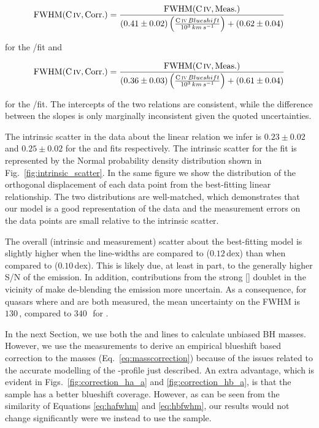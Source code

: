 \begin{equation}
    \label{eq:hafwhm}
    \mathrm{FWHM}(\mathrm{C}\,\textsc{iv}, \mathrm{Corr.}) = \frac{\mathrm{FWHM}(\mathrm{C}\,\textsc{iv}, \mathrm{Meas.})}{ (0.41\pm0.02) \left(\frac{\mathrm{C}\,\textsc{iv}\, Blueshift}{10^3 {\mathrm \,km\,s^{-1}}} \right) + (0.62\pm0.04)}
\end{equation}

\noindent for the /\ha fit and 

\begin{equation}
    \label{eq:hbfwhm}
    \mathrm{FWHM}(\mathrm{C}\,\textsc{iv}, \mathrm{Corr.}) = \frac{\mathrm{FWHM}(\mathrm{C}\,\textsc{iv}, \mathrm{Meas.})}{ (0.36\pm0.03) \left(\frac{\mathrm{C}\,\textsc{iv}\, Blueshift}{10^3 {\mathrm \,km\,s^{-1}}} \right) + (0.61\pm0.04)}
\end{equation}

\noindent for the /\hb fit. 
The intercepts of the two relations are consistent, while the difference between the slopes is only marginally inconsistent given the quoted uncertainties. 

The intrinsic scatter in the data about the linear relation we infer is $0.23 \pm 0.02$ and $0.25 \pm 0.02$ for the \ha and \hb fits respectively. 
The intrinsic scatter for the \ha fit is represented by the Normal probability density distribution shown in Fig.~\ref{fig:intrinsic_scatter}. 
In the same figure we show the distribution of the orthogonal displacement of each data point from the best-fitting linear relationship. 
The two distributions are well-matched, which demonstrates that our model is a good representation of the data and the measurement errors on the data points are small relative to the intrinsic scatter.    

The overall (intrinsic and measurement) scatter about the best-fitting model is slightly higher when the  line-widths are compared to \hb ($0.12$\,dex) than when compared to \ha ($0.10$\,dex). 
This is likely due, at least in part, to the generally higher S/N of the \ha emission. 
In addition, contributions from the strong [] doublet in the vicinity of \hb make de-blending the \hb emission more uncertain. 
As a consequence, for quasars where \ha and \hb are both measured, the mean uncertainty on the \ha FWHM is $130$\,\kms, compared to $340$\,\kms\, for \hbns. 

In the next Section, we use both the \ha and \hb lines to calculate unbiased BH masses. 
However, we use the \ha measurements to derive an empirical  blueshift based correction to the  masses (Eq.~\ref{eq:masscorrection}) because of the issues related to the accurate modelling of the \hbns-profile just described.  
An extra advantage, which is evident in Figs.~\ref{fig:correction_ha_a} and \ref{fig:correction_hb_a}, is that the \ha sample has a better  blueshift coverage. 
However, as can be seen from the similarity of Equations \ref{eq:hafwhm} and \ref{eq:hbfwhm}, our results would not change significantly were we instead to use the \hb sample. 

